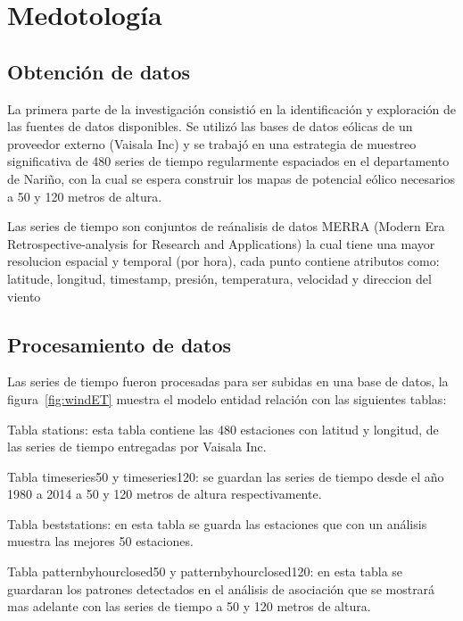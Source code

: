 \section{Medotología}


\subsection{Obtención de datos}

La primera parte de la investigación consistió en la identificación y exploración
 de las fuentes de datos disponibles. Se utilizó las
bases de datos eólicas de un proveedor externo (Vaisala Inc) y se trabajó
en una estrategia de muestreo significativa de
480 series de tiempo regularmente espaciados en el departamento de Nariño,
con la cual se espera construir los mapas de potencial eólico
necesarios a 50 y 120 metros de altura. 

Las series de tiempo son conjuntos de reánalisis de datos MERRA (Modern Era Retrospective-analysis for Research and Applications) la cual
tiene una mayor resolucion espacial y temporal (por hora), cada punto contiene
atributos como: latitude, longitud, timestamp, presión, temperatura, velocidad y direccion del viento

\subsection{Procesamiento de datos}

Las series de tiempo fueron procesadas para ser subidas en una base de datos, la figura~\ref{fig:windET} muestra el modelo
entidad relación con las siguientes tablas:

Tabla stations: esta tabla contiene las 480 estaciones con latitud y longitud, de las series de tiempo entregadas por Vaisala Inc.

Tabla timeseries50 y timeseries120: se guardan las series de tiempo desde el año 1980 a 2014 a 50 y 120 metros de altura respectivamente.

Tabla beststations: en esta tabla se guarda las estaciones que con un análisis muestra las mejores 50 estaciones.

Tabla patternbyhourclosed50 y patternbyhourclosed120: en esta tabla se guardaran los patrones detectados en el análisis
de asociación que se mostrará mas adelante con las series de tiempo a 50 y 120 metros de altura.


